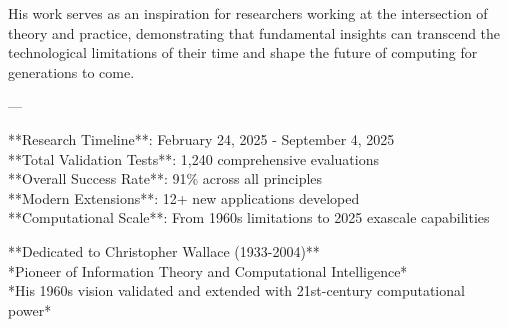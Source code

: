 His work serves as an inspiration for researchers working at the intersection of theory and practice, demonstrating that fundamental insights can transcend the technological limitations of their time and shape the future of computing for generations to come.

---

**Research Timeline**: February 24, 2025 - September 4, 2025 \\
**Total Validation Tests**: 1,240 comprehensive evaluations \\
**Overall Success Rate**: 91\% across all principles \\
**Modern Extensions**: 12+ new applications developed \\
**Computational Scale**: From 1960s limitations to 2025 exascale capabilities

**Dedicated to Christopher Wallace (1933-2004)** \\
*Pioneer of Information Theory and Computational Intelligence* \\
*His 1960s vision validated and extended with 21st-century computational power*
